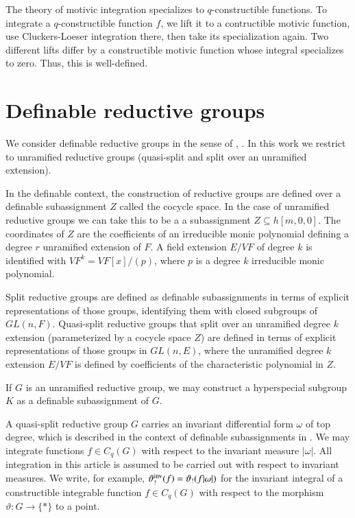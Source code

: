 The theory of motivic integration specializes to $q$-constructible functions. To integrate a $q$-constructible function $f$, we lift it to 
a contructible motivic function, use Cluckers-Loeser integration there, then take its specialization again.
Two different lifts differ by a constructible motivic function whose integral specializes to zero. Thus, this
is well-defined.

\section{Definable reductive groups}

We consider definable reductive groups in the sense of \cite{cluckers2011transfer}, \cite{gordon}.
In this work we restrict to unramified reductive groups (quasi-split and split over an unramified extension).

In the definable context, the construction of reductive groups are defined over a definable subassignment
$Z$ called the cocycle space.  In the case of unramified reductive groups we can take this to be a
a subassignment $Z\subseteq h[m,0,0]$.  The coordinates of $Z$ are the coefficients of an irreducible monic 
polynomial defining a degree $r$ unramified extension of $F$.  A field extension $E/VF$ of degree $k$ is identified
with $VF^k = VF[x]/(p)$, where $p$ is a degree $k$ irreducible monic polynomial.

Split reductive groups are defined as definable subassignments in terms of explicit representations of those groups,
identifying them with closed subgroups of $GL(n,F)$.  Quasi-split reductive groups that split over an unramified degree $k$
extension (parameterized by a cocycle space $Z$) are defined in terms of explicit representations of those groups
in $GL(n,E)$, where the unramified degree $k$ extension $E/VF$ is defined by coefficients of the characteristic polynomial in $Z$.

If $G$ is an unramified reductive group, we may construct a hyperspecial subgroup $K$ as a definable subassignment of $G$.

A quasi-split reductive group $G$ carries an invariant differential form $\omega$ of top degree, which is described in the
context of definable subassignments in \cite{gordon}.
We may integrate functions $f\in C_q(G)$ with respect to the invariant measure $|\omega|$.
All integration in this article is assumed to be carried out with respect to invariant measures.  We write, for example,
$\vartheta_!^{\operatorname{inv}}(f) = \vartheta_!(f|\omega|)$ for the invariant integral of a constructible integrable function $f\in C_q(G)$ with respect to the
morphism $\vartheta:G\to\{*\}$ to a point.

